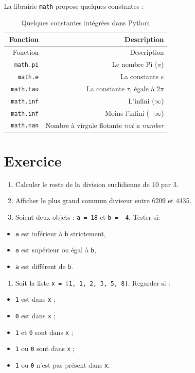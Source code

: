 \documentclass[12pt,]{book}
\providecommand{\tightlist}{%
  \setlength{\itemsep}{0pt}\setlength{\parskip}{0pt}}
\numberwithin{equation}{section}
\numberwithin{countremarque}{section}
\let\BeginKnitrBlock\begin \let\EndKnitrBlock\end
\begin{document}
La librairie \texttt{math} propose quelques constantes :

\begin{longtable}[]{@{}rr@{}}
\caption{\label{tab:constantes-base} Quelques constantes intégrées dans
Python}\tabularnewline
\toprule
Fonction & Description\tabularnewline
\midrule
\endfirsthead
\toprule
Fonction & Description\tabularnewline
\midrule
\endhead
\texttt{math.pi} & Le nombre Pi (\(\pi\))\tabularnewline
\texttt{math.e} & La constante \(e\)\tabularnewline
\texttt{math.tau} & La constante \(\tau\), égale à
\(2\pi\)\tabularnewline
\texttt{math.inf} & L'infini (\(\infty\))\tabularnewline
\texttt{-math.inf} & Moins l'infini (\(-\infty\))\tabularnewline
\texttt{math.nan} & Nombre à virgule flotante \emph{not a
number}\tabularnewline
\bottomrule
\end{longtable}

\section{Exercice}\label{exercice-2}

\BeginKnitrBlock{exframe}
\begin{enumerate}
\def\labelenumi{\arabic{enumi}.}
\tightlist
\item
  Calculer le reste de la division euclidienne de 10 par 3.
\item
  Afficher le plus grand commun diviseur entre 6209 et 4435.
\item
  Soient deux objets : \texttt{a\ =\ 18} et \texttt{b\ =\ -4}. Tester
  si:
\end{enumerate}

\begin{itemize}
\tightlist
\item
  \texttt{a} est inférieur à \texttt{b} strictement,
\item
  \texttt{a} est supérieur ou égal à \texttt{b},
\item
  \texttt{a} est différent de \texttt{b}.
\end{itemize}

\begin{enumerate}
\def\labelenumi{\arabic{enumi}.}
\setcounter{enumi}{3}
\tightlist
\item
  Soit la liste \texttt{x\ =\ {[}1,\ 1,\ 2,\ 3,\ 5,\ 8{]}}. Regarder si
  :
\end{enumerate}

\begin{itemize}
\tightlist
\item
  \texttt{1} est dans \texttt{x} ;
\item
  \texttt{0} est dans \texttt{x} ;
\item
  \texttt{1} et \texttt{0} sont dans \texttt{x} ;
\item
  \texttt{1} ou \texttt{0} sont dans \texttt{x} ;
\item
  \texttt{1} ou \texttt{0} n'est pas présent dans \texttt{x}.
\end{itemize}
\EndKnitrBlock{exframe}
\end{document}
